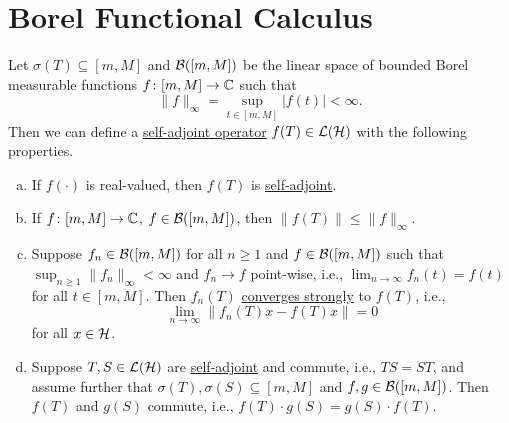 \section{Borel Functional Calculus}

\begin{theorem}\label{thm:Borel-functional-calculus}
	Let \(\sigma (T) \subseteq [m, M]\) and \(\mathcal{\MakeUppercase{B}} ([m, M])\) be the linear space of bounded Borel measurable functions \(f\colon [m, M] \to\mathbb{\MakeUppercase{c}}  \) such that
	\[
		\lVert f \rVert _\infty = \sup _{t\in[m, M]} \vert f(t) \vert  < \infty.
	\]
	Then we can define a \hyperref[def:self-adjoint-op]{self-adjoint operator} \(f(T)\in \mathcal{\MakeUppercase{l}} (\mathcal{\MakeUppercase{h}} )\) with the following properties.
	\begin{enumerate}[(a)]
		\item If \(f(\cdot)\) is real-valued, then \(f(T)\) is \hyperref[def:self-adjoint-op]{self-adjoint}.
		\item If \(f\colon [m, M] \to \mathbb{\MakeUppercase{c}} \), \(f\in \mathcal{\MakeUppercase{B}} ([m, M])\), then \(\lVert f(T) \rVert \leq \lVert f \rVert _\infty \).
		\item Suppose \(f_n \in \mathcal{\MakeUppercase{B}} ([m, M])\) for all \(n\geq 1\) and \(f\in \mathcal{\MakeUppercase{B}} ([m, M])\) such that \(\sup _{n\geq 1}\lVert f_n \rVert _\infty < \infty \) and \(f_n \to f\) point-wise, i.e., \(\lim_{n \to \infty} f_n(t) = f(t)\) for all \(t\in [m, M]\). Then \(f_n(T)\) \hyperref[def:strongly-convergence]{converges strongly} to \(f(T)\), i.e.,
		      \[
			      \lim_{n \to \infty} \lVert f_n(T) x - f(T) x \rVert = 0
		      \]
		      for all \(x\in \mathcal{\MakeUppercase{h}} \).
		\item Suppose \(T, S \in \mathcal{\MakeUppercase{l}} (\mathcal{\MakeUppercase{h}} )\) are \hyperref[def:self-adjoint-op]{self-adjoint} and commute, i.e., \(TS = ST\), and assume further that \(\sigma (T), \sigma (S) \subseteq [m, M]\) and \(f, g\in \mathcal{\MakeUppercase{b}} ([m, M])\). Then \(f(T)\) and \(g(S)\) commute, i.e., \(f(T) \cdot g(S) = g(S) \cdot f(T)\).
	\end{enumerate}
\end{theorem}